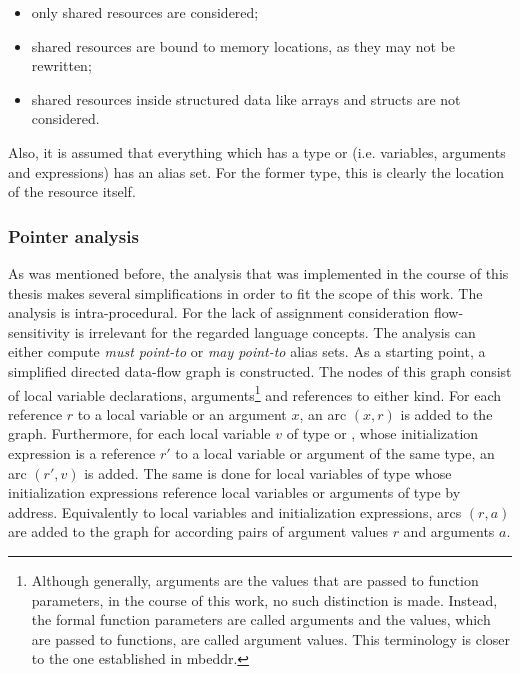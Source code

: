 \vspace{10mm}
\begin{itemize}
\item only shared resources are considered;
\item shared resources are bound to memory locations, as they may not be rewritten;
\item shared resources inside structured data like arrays and structs are not considered.
\end{itemize}

Also, it is assumed that everything which has a type  or  (i.e. variables, arguments and expressions) has an alias set. For the former type, this is clearly the location of the resource itself.

\subsubsection*{Pointer analysis}
As was mentioned before, the analysis that was implemented in the course of this thesis makes several simplifications in order to fit the scope of this work. The analysis is intra-procedural. For the lack of assignment consideration flow-sensitivity is irrelevant for the regarded language concepts. The analysis can either compute \textit{must point-to} or \textit{may point-to} alias sets.
As a starting point, a simplified directed data-flow graph is constructed. The nodes of this graph consist of local variable declarations, arguments\footnote{Although generally, arguments are the values that are passed to function parameters, in the course of this work, no such distinction is made. Instead, the formal function parameters are called arguments and the values, which are passed to functions, are called argument values. This terminology is closer to the one established in mbeddr.} and references to either kind. For each reference $r$ to a local variable or an argument $x$, an arc $(x, r)$ is added to the graph. Furthermore, for each local variable $v$ of type  or , whose initialization expression is a reference $r'$ to a local variable or argument of the same type, an arc $(r', v)$ is added. The same is done for local variables of type  whose initialization expressions reference local variables or arguments of type  by address. Equivalently to local variables and initialization expressions, arcs $(r, a)$ are added to the graph for according pairs of argument values $r$ and arguments $a$.

